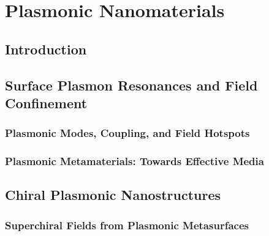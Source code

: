\chapter{Plasmonic Nanomaterials}\label{sec:background:Plasmonics}

\section{Introduction}

\section{Surface Plasmon Resonances and Field Confinement}
\subsection{Plasmonic Modes, Coupling, and Field Hotspots}
\subsection{Plasmonic Metamaterials: Towards Effective Media}\label{sec:background:Plasmonics:Metamaterials}

\section{Chiral Plasmonic Nanostructures}
\subsection{Superchiral Fields from Plasmonic Metasurfaces}